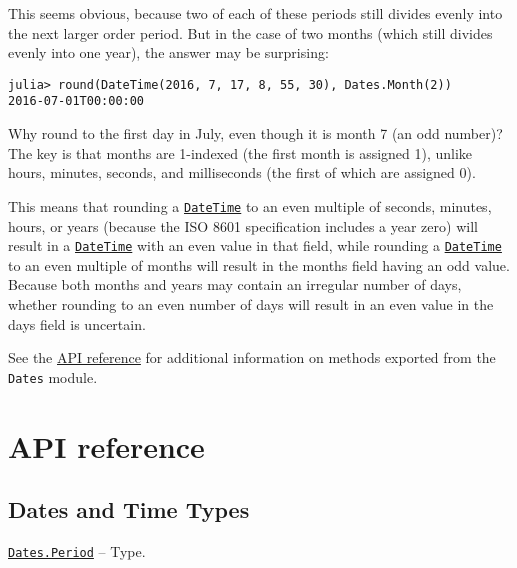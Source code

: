 This seems obvious, because two of each of these periods still divides evenly into the next larger order period. But in the case of two months (which still divides evenly into one year), the answer may be surprising:




\begin{verbatim}
julia> round(DateTime(2016, 7, 17, 8, 55, 30), Dates.Month(2))
2016-07-01T00:00:00
\end{verbatim}



Why round to the first day in July, even though it is month 7 (an odd number)? The key is that months are 1-indexed (the first month is assigned 1), unlike hours, minutes, seconds, and milliseconds (the first of which are assigned 0).



This means that rounding a \hyperlink{17572689933274889838}{\texttt{DateTime}} to an even multiple of seconds, minutes, hours, or years (because the ISO 8601 specification includes a year zero) will result in a \hyperlink{17572689933274889838}{\texttt{DateTime}} with an even value in that field, while rounding a \hyperlink{17572689933274889838}{\texttt{DateTime}} to an even multiple of months will result in the months field having an odd value. Because both months and years may contain an irregular number of days, whether rounding to an even number of days will result in an even value in the days field is uncertain.



See the \hyperlink{2504340439131318713}{API reference} for additional information on methods exported from the \texttt{Dates} module.



\hypertarget{14493106802066079367}{}


\chapter{API reference}



\hypertarget{7753070305007462051}{}


\section{Dates and Time Types}


\hypertarget{17624028548543163266}{} 
\hyperlink{17624028548543163266}{\texttt{Dates.Period}}  -- {Type.}

